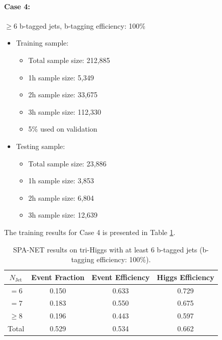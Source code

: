 \documentclass[12pt]{article}
\begin{document}
		\paragraph{Case 4:} $\ge 6$ b-tagged jets, b-tagging efficiency: 100\% 
		\begin{itemize}
			\item Training sample:
			\begin{itemize}
				\item Total sample size: 212,885
				\item 1h sample size: 5,349
				\item 2h sample size: 33,675
				\item 3h sample size: 112,330
				\item 5\% used on validation
			\end{itemize}
			\item Testing sample: 
				\begin{itemize}
					\item Total sample size: 23,886
					\item 1h sample size: 3,853
					\item 2h sample size: 6,804
					\item 3h sample size: 12,639
				\end{itemize}
		\end{itemize}
		The training results for Case 4 is presented in Table \ref{tab:SPANet_triHiggs_6btag_100}.
		\begin{table}[htpb]
			\centering
			\caption{SPA-NET results on tri-Higgs with at least 6 b-tagged jets (b-tagging efficiency: 100\%).}
			\label{tab:SPANet_triHiggs_6btag_100}
			\begin{tabular}{c|c|cc}
				$N_\text{Jet}$ & Event Fraction & Event Efficiency & Higgs Efficiency \\
				\hline
				$=6$	  &   0.150             &    0.633              &    0.729             \\
				$=7$	  &   0.183             &    0.550              &    0.675             \\
				$\ge 8$	  &   0.196             &    0.443              &    0.597             \\
				Total	  &   0.529             &    0.534              &    0.662             \\
			\end{tabular}
		\end{table}
\end{document}
